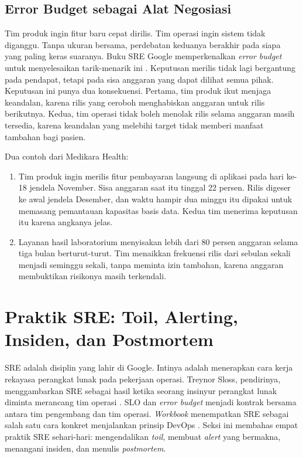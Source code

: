 \subsection{Error Budget sebagai Alat Negosiasi}

Tim produk ingin fitur baru cepat dirilis. Tim operasi ingin sistem tidak diganggu. Tanpa ukuran
bersama, perdebatan keduanya berakhir pada siapa yang paling keras suaranya. Buku SRE Google
memperkenalkan \textit{error budget} untuk menyelesaikan tarik-menarik ini \cite{beyer2016}.
Keputusan merilis tidak lagi bergantung pada pendapat, tetapi pada sisa anggaran yang dapat dilihat
semua pihak. Keputusan ini punya dua konsekuensi. Pertama, tim produk ikut menjaga keandalan,
karena rilis yang ceroboh menghabiskan anggaran untuk rilis berikutnya. Kedua, tim operasi tidak
boleh menolak rilis selama anggaran masih tersedia, karena keandalan yang melebihi target tidak
memberi manfaat tambahan bagi pasien.

Dua contoh dari Medikara Health:
\begin{enumerate}
  \item Tim produk ingin merilis fitur pembayaran langsung di aplikasi pada hari ke-18 jendela
        November. Sisa anggaran saat itu tinggal 22 persen. Rilis digeser ke awal jendela
        Desember, dan waktu hampir dua minggu itu dipakai untuk memasang pemantauan kapasitas basis
        data. Kedua tim menerima keputusan itu karena angkanya jelas.
  \item Layanan hasil laboratorium menyisakan lebih dari 80 persen anggaran selama tiga bulan
        berturut-turut. Tim menaikkan frekuensi rilis dari sebulan sekali menjadi seminggu sekali,
        tanpa meminta izin tambahan, karena anggaran membuktikan risikonya masih terkendali.
\end{enumerate}

\section{Praktik SRE: Toil, Alerting, Insiden, dan Postmortem}
\label{sec:ch11-praktik-sre}

SRE adalah disiplin yang lahir di Google. Intinya adalah menerapkan cara kerja rekayasa perangkat
lunak pada pekerjaan operasi. Treynor Sloss, pendirinya, menggambarkan SRE sebagai hasil ketika
seorang insinyur perangkat lunak diminta merancang tim operasi \cite{beyer2016}. SLO dan
\textit{error budget} menjadi kontrak bersama antara tim pengembang dan tim operasi. \textit{Workbook}
menempatkan SRE sebagai salah satu cara konkret menjalankan prinsip DevOps
\cite{c11-sre-workbook}. Seksi ini membahas empat praktik SRE sehari-hari: mengendalikan
\textit{toil}, membuat \textit{alert} yang bermakna, menangani insiden, dan menulis
\textit{postmortem}.

